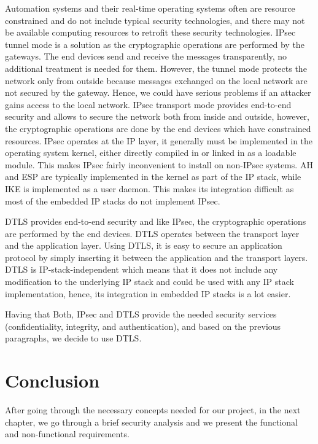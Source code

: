 Automation systems and their real-time operating
systems often are resource constrained and do not include typical security technologies,
and there may not be available computing resources to retrofit these security technologies. \ac{IPsec} tunnel mode
is a solution as the cryptographic operations are performed by the gateways. The end devices send and receive the messages transparently, no additional treatment is needed for them. However, the tunnel mode protects the network only from outside because
messages exchanged on the local network are not secured by the gateway. Hence, we could have serious problems if
an attacker gains access to the local network. \ac{IPsec} transport mode provides end-to-end security and allows to secure the network both
from inside and outside, however, the cryptographic operations are done by the end devices which have constrained resources.
\ac{IPsec} operates at the \ac{IP} layer, it generally must be implemented in the operating
system kernel, either directly compiled in or linked in as a loadable module. This makes \ac{IPsec} fairly inconvenient
to install on non-\ac{IPsec} systems. \ac{AH} and \ac{ESP} are typically implemented in the kernel as part of the \ac{IP} stack, while \ac{IKE}
is implemented as a user daemon. This makes its integration difficult as most of the embedded \ac{IP} stacks do not implement \ac{IPsec}.

\ac{DTLS} provides end-to-end security and like \ac{IPsec}, the cryptographic operations are performed by the end devices.
\ac{DTLS} operates between the transport layer and the application layer. Using DTLS, it is easy to secure an application
 protocol by simply inserting it between the application and the transport layers. \ac{DTLS} is \ac{IP}-stack-independent
which means that it does not include any modification to the underlying \ac{IP} stack and could be used with any \ac{IP} stack implementation,
hence, its integration in embedded \ac{IP} stacks is a lot easier.

Having that Both, \ac{IPsec} and \ac{DTLS} provide the needed security services (confidentiality, integrity, and authentication),
and based on the previous paragraphs, we decide to use DTLS.

\section*{Conclusion}

After going through the necessary concepts needed for our project, in the next chapter, we go through a
brief security analysis and we present the functional and non-functional requirements.
